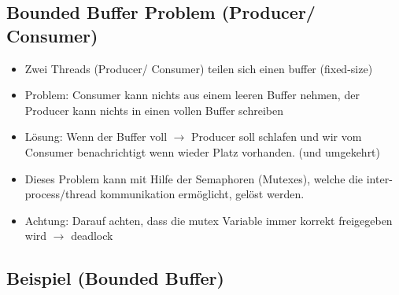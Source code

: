 \subsection{Bounded Buffer Problem (Producer/ Consumer)}
\begin{itemize}
    \item Zwei Threads (Producer/ Consumer) teilen sich einen buffer (fixed-size)
    \item Problem: Consumer kann nichts aus einem leeren Buffer nehmen, der Producer kann nichts in einen vollen Buffer schreiben
    \item Lösung: Wenn der Buffer voll $\rightarrow$ Producer soll schlafen und wir vom Consumer benachrichtigt wenn wieder Platz vorhanden. (und umgekehrt)
    \item Dieses Problem kann mit Hilfe der Semaphoren (Mutexes), welche die inter-process/thread kommunikation ermöglicht, gelöst werden.
    \item Achtung: Darauf achten, dass die mutex Variable immer korrekt freigegeben wird $\rightarrow$ deadlock
\end{itemize}
\subsection{Beispiel (Bounded Buffer)}
\begin{multicols}{2}
    
\end{multicols}
